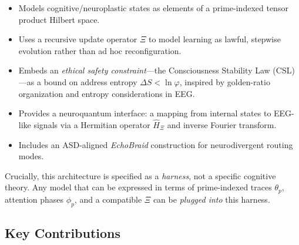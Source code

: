 \documentclass[11pt]{article}
\begin{document}
\begin{itemize}[noitemsep]
  \item Models cognitive/neuroplastic states as elements of a prime-indexed tensor product Hilbert space.
  \item Uses a recursive update operator $\Xi$ to model learning as lawful, stepwise evolution rather than ad hoc reconfiguration.
  \item Embeds an \emph{ethical safety constraint}---the Consciousness Stability Law (CSL)---as a bound on address entropy $\Delta S < \ln \varphi$, inspired by golden-ratio organization and entropy considerations in EEG. \cite{neuroplasticityMT,EEGEntropyForce,EEGEntropyBiomarker,EEGEntropyASD}
  \item Provides a neuroquantum interface: a mapping from internal states to EEG-like signals via a Hermitian operator $\hat{H}_\Xi$ and inverse Fourier transform.
  \item Includes an ASD-aligned \emph{EchoBraid} construction for neurodivergent routing modes.
\end{itemize}

Crucially, this architecture is specified as a \emph{harness}, not a specific cognitive theory. Any model that can be expressed in terms of prime-indexed traces $\theta_p$, attention phases $\phi_p$, and a compatible $\Xi$ can be \emph{plugged into} this harness.

\subsection{Key Contributions}
\end{document}
